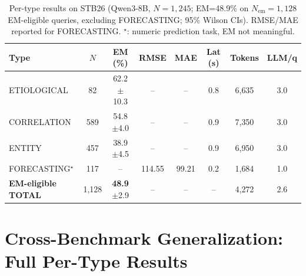 \begin{table}[!htbp]
\centering
\caption{Per-type results on STB26 (Qwen3-8B, $N=1{,}245$; EM=48.9\% on $N_\text{em}=1{,}128$ EM-eligible queries, excluding FORECASTING; 95\% Wilson CIs).  RMSE/MAE reported for FORECASTING.  $^\star$: numeric prediction task, EM not meaningful.}
\label{tab:stbenchnew_full}
\small
\begin{tabular}{lccccccc}
\toprule
Type & $N$ & EM (\%) & RMSE & MAE & Lat (s) & Tokens & LLM/q \\
\midrule
ETIOLOGICAL  & 82  & 62.2\tiny{$\pm$10.3} & --     & --    & 0.8 & 6{,}635 & 3.0 \\
CORRELATION  & 589 & 54.8\tiny{$\pm$4.0}  & --     & --    & 0.9 & 7{,}350 & 3.0 \\
ENTITY       & 457 & 38.9\tiny{$\pm$4.5}  & --     & --    & 0.9 & 6{,}950 & 3.0 \\
FORECASTING$^\star$ & 117 & --            & 114.55 & 99.21 & 0.2 & 1{,}684 & 1.0 \\
\midrule
\textbf{EM-eligible TOTAL} & 1{,}128 & \textbf{48.9}\tiny{$\pm$2.9} & -- & -- & -- & 4{,}272 & 2.6 \\
\bottomrule
\end{tabular}
\end{table}


\FloatBarrier
\section{Cross-Benchmark Generalization: Full Per-Type Results}
\label{app:cross_benchmark}

